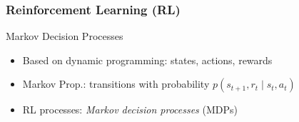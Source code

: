 \documentclass[xcolor=table%
,t]{beamer}
\begin{document}
\begin{frame}[t]
  \frametitle{Reinforcement Learning (RL)}

  \begin{block}{Markov Decision Processes~\footnotemark}
    \centering
    


    \begin{itemize}
      \item Based on dynamic programming: states, actions, rewards
      \item Markov Prop.: transitions with probability \(p(s_{t+1}, r_{t} \mid s_{t}, a_{t})\)
      \item RL processes: \textit{Markov decision processes} (MDPs)
    \end{itemize}

\end{block}
\end{frame}
\end{document}
